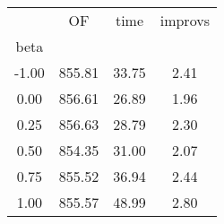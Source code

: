 \begin{tabular}{cccc}
\toprule
{} &     OF &  time &  improvs \\
beta  &        &       &          \\
\midrule
-1.00 & 855.81 & 33.75 &     2.41 \\
 0.00 & 856.61 & 26.89 &     1.96 \\
 0.25 & 856.63 & 28.79 &     2.30 \\
 0.50 & 854.35 & 31.00 &     2.07 \\
 0.75 & 855.52 & 36.94 &     2.44 \\
 1.00 & 855.57 & 48.99 &     2.80 \\
\bottomrule
\end{tabular}
